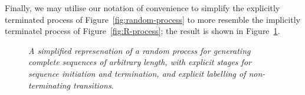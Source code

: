 \documentclass[a4paper]{article}
\begin{document}
Finally, we may utilise our notation of convenience to simplify the explicitly terminated process of Figure~\ref{fig:random-process} 
to more resemble the implicitly terminatel process of Figure~\ref{fig:R-process}; the result is shown in Figure~\ref{fig:simple-random-process}.
\begin{figure}[hbt]
\centering
{}
\caption{\em A simplified represenation of a random process for generating complete sequences of arbitrary length,
with explicit stages for sequence initiation and termination, and explicit labelling of non-terminating transitions.}
\label{fig:simple-random-process}
\end{figure}

\end{document}
